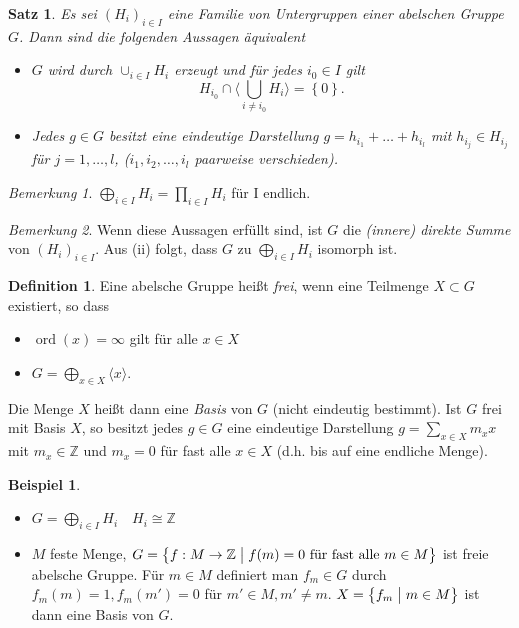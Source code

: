 \documentclass[12pt]{scrartcl} %
\newcommand{\divides}{\bigm|}
\newtheorem{thm}{Satz}
\theoremstyle{definition}
\newtheorem*{defn}{Definition}
\newtheorem{ex}{Beispiel}
\theoremstyle{remark}
\newtheorem*{nb}{Bemerkung}
\begin{document}
\begin{thm}
  Es sei $(H_i)_{i \in I}$ eine Familie von Untergruppen einer abelschen Gruppe $G$. Dann sind die folgenden Aussagen äquivalent
\begin{itemize}
  \item[(i)]  $G$ wird durch $\cup_{i \in I} H_i$ erzeugt und für jedes $i_0 \in I$ gilt 
    \[ H_{i_0} \cap \langle \bigcup_{i \neq i_0} H_i \rangle = \left\{ 0 \right\}. \]
  \item Jedes $g \in G$ besitzt eine eindeutige Darstellung $g = h_{i_1} + \dots + h_{i_l}$ mit $h_{i_j} \in H_{i_j}$ für $j = 1,\dots,l$, ($i_1,i_2,\dots,i_l$ paarweise verschieden).
\end{itemize}
\end{thm}

\begin{nb}
  $ \bigoplus_{i \in I} H_i = \prod_{i \in I} H_i $ für I endlich.
\end{nb}

\begin{nb}
  Wenn diese Aussagen erfüllt sind, ist $G$ die \emph{(innere) direkte Summe} von $(H_i)_{i \in I}$. Aus (ii) folgt, dass $G$ zu $\bigoplus_{i \in I} H_i$ isomorph ist. 
\end{nb}

\begin{defn}
  Eine abelsche Gruppe heißt \emph{frei}, wenn eine Teilmenge $X \subset G$ existiert, so dass
  \begin{itemize}
    \item[(i)] $\operatorname{ord}(x) = \infty$ gilt für alle $x \in X$
    \item[(ii)] $G = \bigoplus_{x \in X} \langle x \rangle$.
  \end{itemize}

  Die Menge $X$ heißt dann eine \emph{Basis} von $G$ (nicht eindeutig bestimmt). Ist $G$ frei mit Basis $X$, so besitzt jedes $g \in G$ eine eindeutige Darstellung $g = \sum_{x \in X} m_x x$ mit $m_x \in \mathbb{Z}$ und $m_x = 0$ für fast alle $x \in X$ (d.h. bis auf eine endliche Menge).
\end{defn}

\begin{ex}
  \begin{itemize}
    \item $G = \bigoplus_{i \in I} H_i \quad H_i \cong \mathbb{Z}$
    \item $M$ feste Menge, $G = \left\{ f : M \to \mathbb{Z} \divides f(m) = 0 \text{ für fast alle } m \in M \right\}$ ist freie abelsche Gruppe.  Für $m \in M$ definiert man $f_m \in G$ durch $f_m(m) = 1, f_m(m') = 0$ für $m' \in M, m' \neq m$. $X = \left\{ f_m \divides m \in M \right\}$ ist dann eine Basis von $G$.
  \end{itemize}
\end{ex}
\end{document}
